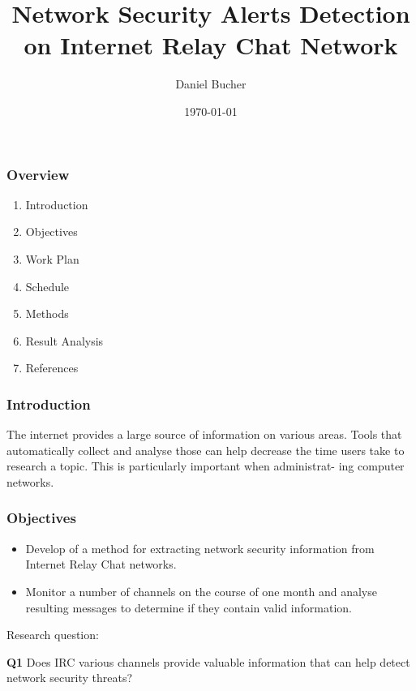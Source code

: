 \documentclass{beamer}
\title[AP2]{Network Security Alerts Detection on Internet Relay Chat Network}
\author{Daniel Bucher} %
\institute[USP] %
{
Universidade de São Paulo \\ %
\medskip
\textit{dbucher@ime.usp.br} %
}
\date{\today} %
\begin{document}
\begin{frame}
\titlepage %
\end{frame}

\begin{frame}
\frametitle{Overview}

\begin{enumerate}
    \item{Introduction}
    \item{Objectives}
    \item{Work Plan}
    \item{Schedule}
    \item{Methods}
    \item{Result Analysis}
    \item{References}
\end{enumerate}
\end{frame}

\begin{frame}
\frametitle{Introduction}

The internet provides a large source of information on various areas.
Tools that automatically collect and analyse those can help decrease the time
users take to research a topic. This is particularly important when administrat-
ing computer networks.
\end{frame}


\begin{frame}
\frametitle{Objectives}

\begin{itemize}
    \item Develop of a method for extracting network security information from Internet
        Relay Chat networks.
    \item Monitor a number of channels on the course of one month and analyse resulting
        messages to determine if they contain valid information.
\end{itemize}

Research question:

\textbf{Q1} Does IRC various channels provide valuable information that can help detect
network security threats?
\end{frame}
\end{document}
